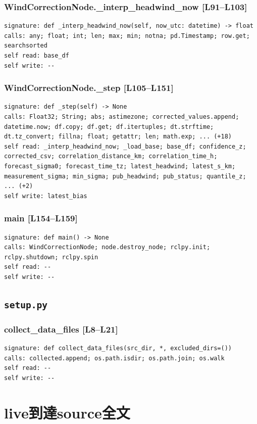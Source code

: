 \documentclass[a4paper,10pt,oneside]{book}
\begin{document}
\subsection*{WindCorrectionNode.\_interp\_headwind\_now [L91--L103]}
\begin{lstlisting}[numbers=none]
signature: def _interp_headwind_now(self, now_utc: datetime) -> float
calls: any; float; int; len; max; min; notna; pd.Timestamp; row.get; searchsorted
self read: base_df
self write: --
\end{lstlisting}
\subsection*{WindCorrectionNode.\_step [L105--L151]}
\begin{lstlisting}[numbers=none]
signature: def _step(self) -> None
calls: Float32; String; abs; astimezone; corrected_values.append; datetime.now; df.copy; df.get; df.itertuples; dt.strftime; dt.tz_convert; fillna; float; getattr; len; math.exp; ... (+18)
self read: _interp_headwind_now; _load_base; base_df; confidence_z; corrected_csv; correlation_distance_km; correlation_time_h; forecast_sigma0; forecast_time_tz; latest_headwind; latest_s_km; measurement_sigma; min_sigma; pub_headwind; pub_status; quantile_z; ... (+2)
self write: latest_bias
\end{lstlisting}
\subsection*{main [L154--L159]}
\begin{lstlisting}[numbers=none]
signature: def main() -> None
calls: WindCorrectionNode; node.destroy_node; rclpy.init; rclpy.shutdown; rclpy.spin
self read: --
self write: --
\end{lstlisting}
\section{\texttt{setup.py}}
\subsection*{collect\_data\_files [L8--L21]}
\begin{lstlisting}[numbers=none]
signature: def collect_data_files(src_dir, *, excluded_dirs=())
calls: collected.append; os.path.isdir; os.path.join; os.walk
self read: --
self write: --
\end{lstlisting}
\appendix
\chapter{live到達source全文}
\end{document}
